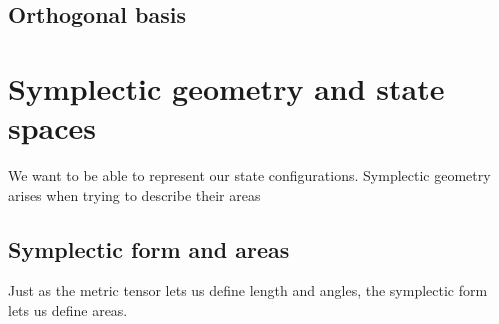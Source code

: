 \documentclass{book}
\begin{document}
\subsection{Orthogonal basis}

\section{Symplectic geometry and state spaces}
We want to be able to represent our state configurations. Symplectic geometry arises when trying to describe their areas

\subsection{Symplectic form and areas}
Just as the metric tensor lets us define length and angles, the symplectic form lets us define areas. 
\end{document}
